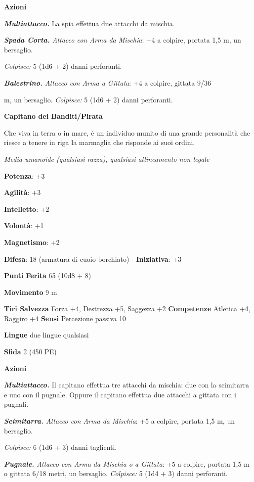 \begin{multicols}{2}
\textbf{Azioni}

\emph{\textbf{Multiattacco.}} La spia effettua due attacchi da mischia.

\emph{\textbf{Spada Corta.} Attacco con Arma da Mischia}: +4 a colpire,
portata 1,5 m, un bersaglio.

\emph{Colpisce:} 5 (1d6 + 2) danni perforanti.

\emph{\textbf{Balestrino.} Attacco con Arma a Gittata}: +4 a colpire,
gittata 9/36

m, un bersaglio. \emph{Colpisce:} 5 (1d6 + 2) danni perforanti.



\textbf{Capitano dei Banditi/Pirata}

Che viva in terra o in mare, è un individuo munito di una grande
personalità che riesce a tenere in riga la marmaglia che risponde ai
suoi ordini.

\emph{Media umanoide (qualsiasi razza), qualsiasi allineamento non
legale}

\textbf{Potenza}: +3

\textbf{Agilità}: +3

\textbf{Intelletto}: +2

\textbf{Volontà}: +1

\textbf{Magnetismo}: +2

\textbf{Difesa}: 18 (armatura di cuoio borchiato) - \textbf{Iniziativa}: +3

\textbf{Punti Ferita} 65 (10d8 + 8)

\textbf{Movimento} 9 m

\textbf{Tiri Salvezza} Forza +4, Destrezza +5, Saggezza +2
\textbf{Competenze} Atletica +4, Raggiro +4 \textbf{Sensi} Percezione
passiva 10

\textbf{Lingue} due lingue qualsiasi

\textbf{Sfida} 2 (450 PE)

\textbf{Azioni}

\emph{\textbf{Multiattacco.}} Il capitano effettua tre attacchi da
mischia: due con la scimitarra e uno con il pugnale. Oppure il capitano
effettua due attacchi a gittata con i pugnali.

\emph{\textbf{Scimitarra.} Attacco con Arma da Mischia}: +5 a colpire,
portata 1,5 m, un bersaglio.

\emph{Colpisce:} 6 (1d6 + 3) danni taglienti.

\emph{\textbf{Pugnale.} Attacco con Arma da Mischia o a Gittata}: +5 a
colpire, portata 1,5 m o gittata 6/18 metri, un bersaglio.
\emph{Colpisce:} 5 (1d4 + 3) danni perforanti.


\end{multicols}

